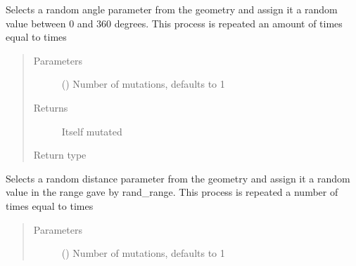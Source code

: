\documentclass[letterpaper,10pt,english]{sphinxmanual}
\begin{document}
\begin{fulllineitems}
\begin{fulllineitems}
\label{\detokenize{MolOpt.molecular:MolOpt.molecular.molecular.Molecule.mutate_angles}}
\sphinxAtStartPar
Selects a random angle parameter from the geometry and assign it a random value between 0 and 360 degrees. 
This process is repeated an amount of times equal to times
\begin{quote}\begin{description}
\item[{Parameters}] \leavevmode
\sphinxAtStartPar
{} (\sphinxstyleliteralemphasis{\sphinxupquote{, }}) \textendash{} Number of mutations, defaults to 1

\item[{Returns}] \leavevmode
\sphinxAtStartPar
Itself mutated

\item[{Return type}] \leavevmode
\sphinxAtStartPar
{\hyperref[\detokenize{MolOpt.molecular:MolOpt.molecular.molecular.Molecule}]{}}

\end{description}\end{quote}

\end{fulllineitems}


\begin{fulllineitems}
\label{\detokenize{MolOpt.molecular:MolOpt.molecular.molecular.Molecule.mutate_distances}}
\sphinxAtStartPar
Selects a random distance parameter from the geometry and assign it a random value in the range gave by 
rand\_range. This process is repeated a number of times equal to times
\begin{quote}\begin{description}
\item[{Parameters}] \leavevmode
\sphinxAtStartPar
{} () \textendash{} Number of mutations, defaults to 1


\end{description}
\end{quote}
\end{fulllineitems}
\end{fulllineitems}
\end{document}
